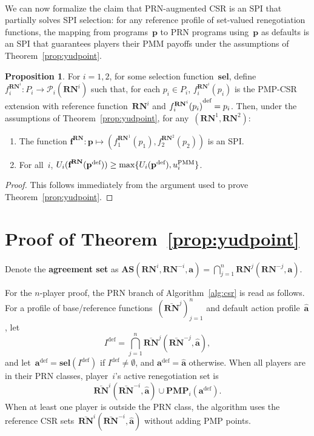 \documentclass[sigconf]{aamas}
\newcommand{\prnspacei}{\mathcal{P}_i}
\newcommand{\selection}{sel}%
\newcommand{\renegb}{\mathbf{\selection}}
\theoremstyle{definition}
\newcommand{\pmsup}{\textnormal{PMM}}%
\newcommand{\intsect}{\textbf{AS}}%
\newcommand{\defprog}[1]{{#1}^{\textnormal{def}}}
\newcommand{\pmp}{\mathbf{PMP}}%
\newcommand{\yudproji}{\pmp_i}
\newcommand{\jointstrategy}{\boldsymbol{a}}
\newcommand{\deffullact}{\widehat{\fullact}}
\newcommand{\pmmi}{\payi^{\pmsup}}
\newcommand{\deffullprog}{\defprog{\fullprog}}
\newcommand{\renegi}{\reneg^{i}}
\newcommand{\renegj}{\reneg^{j}}
\newcommand{\renegmi}{\reneg^{-i}}
\newcommand{\renegmj}{\reneg^{-j}}
\newcommand{\renegone}{\reneg^{1}}
\newcommand{\renegtwo}{\reneg^{2}}
\newcommand{\selfunction}[0]{selection}%
\newcommand{\programspace}{P}
\newcommand{\progi}{\prog_i}
\newcommand{\progspacei}{\programspace_i}
\newcommand{\reneg}{\mathbf{RN}}
\newcommand{\fsprogone}{f_1}
\newcommand{\fsprogtwo}{f_2}
\newcommand{\fsprogi}{f_i}
\newcommand{\fullact}{\jointstrategy}
\newcommand{\fullfs}{\textbf{f}}
\newcommand{\fullprog}{\textbf{\prog}}
\newcommand{\progpayi}{U_i}
\newcommand{\payi}{u_i}
\newcommand{\progone}{\prog_1}
\newcommand{\progtwo}{\prog_2}
\newcommand{\prog}{p}
\newtheorem{proposition}[theorem]{Proposition}
\theoremstyle{definition}
\begin{document}
\

We can now formalize the claim that
PRN-augmented CSR
is an SPI
that partially solves
SPI selection:
for any reference profile of set-valued renegotiation functions,
the mapping from programs~$\fullprog$
to PRN programs using~$\fullprog$ as defaults
is an SPI that guarantees players
their PMM payoffs under the assumptions of
Theorem~\ref{prop:yudpoint}.

\begin{proposition}
\label{prop:itspi}
For $i=1,2$,
for some \selfunction{} function~$\renegb$,
define 
$\fsprogi^{\renegi}: \progspacei \rightarrow \prnspacei(\renegi)$ such that,
for each $\progi \in \progspacei$, $\fsprogi^{\renegi}(\progi)$
is the PMP-CSR extension with reference function~$\renegi$ and
$\defprog{\fsprogi^{\renegi}(\progi)} = \progi$.
Then, 
under the assumptions of 
Theorem~\ref{prop:yudpoint},
for any~$(\renegone, \renegtwo)$:
\begin{enumerate}
    \item The function
    $\fullfs^{\reneg}: \fullprog \mapsto (\fsprogone^{\renegone}(\progone), \fsprogtwo^{\renegtwo}(\progtwo))$ is an SPI.
    \item For all~$i$,
    $\progpayi(\fullfs^{\reneg}(\deffullprog)) \geq \max\{\progpayi(\deffullprog), \pmmi\}$.
\end{enumerate}
\end{proposition}

\begin{proof}
This follows
immediately
from the argument used to prove 
Theorem~\ref{prop:yudpoint}.
\end{proof}


\section{Proof of Theorem~\ref{prop:yudpoint} }

Denote 
the \textbf{agreement set} as 
     $\intsect(\renegi, \renegmi, \fullact) = \bigcap_{j=1}^{n} \renegj(\renegmj, \fullact)$.

For the ${n}$-player proof, the PRN branch of
Algorithm~\ref{alg:csr} is read as follows.
For a profile of base/reference functions~$(\bar{\reneg}^{j})_{j=1}^{n}$
and default action profile~$\deffullact$, let
\[
    {I}^{\mathrm{def}}
    = \bigcap_{j=1}^{n} \bar{\reneg}^{j}(\bar{\reneg}^{-j}, \deffullact),
\]
and let~$\fullact^{\mathrm{def}}=\renegb({I}^{\mathrm{def}})$ if
${I}^{\mathrm{def}}\neq\emptyset$, and
$\fullact^{\mathrm{def}}=\deffullact$ otherwise.
When all players are in their PRN classes, player~$i$'s active
renegotiation set is
\[
    \bar{\reneg}^{i}(\bar{\reneg}^{-i}, \deffullact)
    \cup \yudproji(\fullact^{\mathrm{def}}).
\]
When at least one player is outside the PRN class, the algorithm uses the
reference CSR sets~$\bar{\reneg}^{i}(\bar{\reneg}^{-i},\deffullact)$
without adding PMP points.
\end{document}
